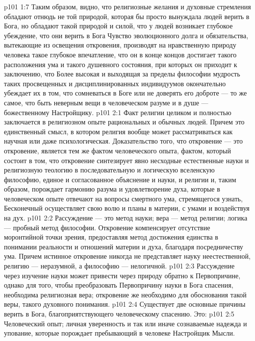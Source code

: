 \vs p101 1:7 Таким образом, видно, что религиозные желания и духовные стремления обладают отнюдь не той природой, которая бы просто вынуждала людей  верить в Бога, но обладают такой природой и силой, что у людей возникает глубокое убеждение, что они верить в Бога  Чувство эволюционного долга и обязательства, вытекающие из освещения откровения, производят на нравственную природу человека такое глубокое впечатление, что он в конце концов достигает такого расположения ума и такого душевного состояния, при которых он приходит к заключению, что  Более высокая и выходящая за пределы философии мудрость таких просвещенных и дисциплинированных индивидуумов окончательно убеждает их в том, что сомневаться в Боге или не доверять его доброте --- то же самое, что быть неверным  вещи в человеческом разуме и в душе --- божественному Настройщику.
\vs p101 2:1 Факт религии целиком и полностью заключается в религиозном опыте рациональных и обычных людей. Причем это единственный смысл, в котором религия вообще может рассматриваться как научная или даже психологическая. Доказательство того, что откровение --- это откровение, является тем же фактом человеческого опыта, фактом, который состоит в том, что откровение синтезирует явно несходные естественные науки и религиозную теологию в последовательную и логическую вселенскую философию, единое и согласованное объяснение и науки, и религии и, таким образом, порождает гармонию разума и удовлетворение духа, которые в человеческом опыте отвечают на вопросы смертного ума, стремящегося узнать,  Бесконечный осуществляет свою волю и планы в материи, с умами и воздействуя на дух.
\vs p101 2:2 Рассуждение --- это метод науки; вера --- метод религии; логика --- пробный метод философии. Откровение компенсирует отсутствие моронтийной точки зрения, предоставляя метод достижения единства в понимании реальности и отношений материи и духа, благодаря посредничеству ума. Причем истинное откровение никогда не представляет науку неестественной, религию --- неразумной, а философию --- нелогичной.
\vs p101 2:3 Рассуждение через изучение науки может привести через природу обратно к Первопричине, однако для того, чтобы преобразовать Первопричину науки в Бога спасения, необходима религиозная вера; откровение же необходимо для обоснования такой веры, такого духовного понимания.
\vs p101 2:4 Существует две основные причины верить в Бога, благоприятствующего человеческому спасению. Это:
\vs p101 2:5 \bibnobreakspace Человеческий опыт; личная уверенность и так или иначе сознаваемые надежда и упование, которые порождает пребывающий в человеке Настройщик Мысли.
